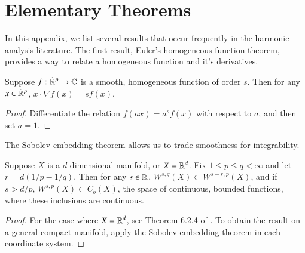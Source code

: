 
\chapter{Elementary Theorems} \label{cha:elementary_theorems}

In this appendix, we list several results that occur frequently in the harmonic analysis literature. The first result, Euler's homogeneous function theorem, provides a way to relate a homogeneous function and it's derivatives.

\begin{theorem} \label{thm:Euler}
    Suppose $f: {\dot{\RR}{\vphantom{\RR}}^p} \to \CC$ is a smooth, homogeneous function of order $s$. Then for any $x \in {\dot{\RR}{\vphantom{\RR}}^p}$, $x \cdot \nabla f(x) = s f(x)$.
\end{theorem}
\begin{proof}
    Differentiate the relation $f(ax) = a^s f(x)$ with respect to $a$, and then set $a = 1$.
\end{proof}

The Sobolev embedding theorem allows us to trade smoothness for integrability.

\begin{theorem} \label{Chp:Sobolev}
    Suppose $X$ is a $d$-dimensional manifold, or $X = \operatorname{\mathbb{R}}^d$. Fix $1 \leq p \leq q < \infty$ and let $r = d(1/p - 1/q)$. Then for any $s \in \operatorname{\mathbb{R}}$, $W^{s,q}(X) \subset W^{s-r,p}(X)$, and if $s > d/p$, $W^{s,p}(X) \subset C_b(X)$, the space of continuous, bounded functions, where these inclusions are continuous.
\end{theorem}
\begin{proof}
    For the case where $X = \operatorname{\mathbb{R}}^d$, see Theorem 6.2.4 of \cite{GrafakosModern}. To obtain the result on a general compact manifold, apply the Sobolev embedding theorem in each coordinate system.
\end{proof}

\begin{comment}
\begin{theorem}[Bernstein's Inequality]
    Fix $1 \leq p \leq \infty$, $s \in \RR$, and $R > 0$. If the Fourier transform of a function $f: \RR^d \to \CC$ is supported on $\{ \xi : 0 \leq |\xi| \leq R \}$, then
    \[ \| f \|_{W^{s,p}(\RR^d)} \sim \langle R \rangle^s \| f \|_{L^p(\RR^d)}. \]%
    Similarily, suppose $X$ is a compact manifold, and $P$ is a classical, elliptic, self-adjoint operator of order one on $X$. If $f: \RR^d \to \CC$ can be written as a linear combination of eigenfunctions of $P$, whose eigenvalues are contained in the interval $[0,R]$, then
        \[ \| f \|_{W^{s,p}(X)} \sim \langle R \rangle^s \| f \|_{L^p(\RR^d)} \]
\end{theorem}
\begin{proof}
    For the result on $\RR^d$, see Proposition 5.3 of \cite{Wolff}.
\end{proof}
\end{comment}

